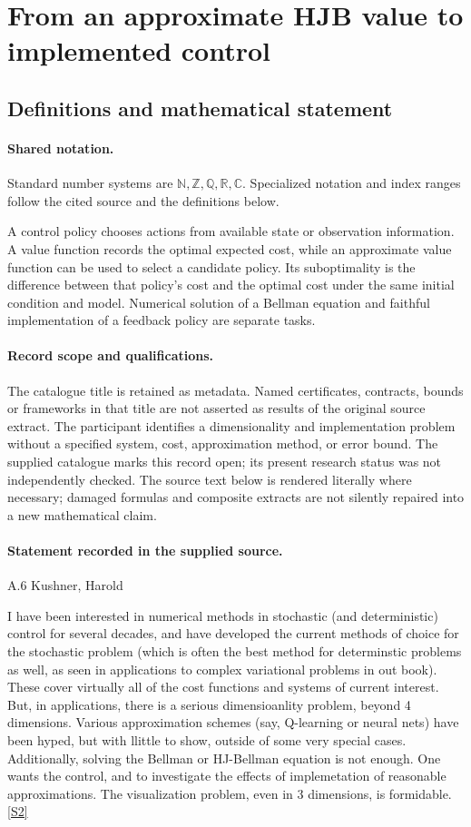 \documentclass[11pt]{article}
\newcommand{\sref}[2]{\hyperlink{source:#1:#2}{[S#2]}}
\begin{document}
\section{From an approximate HJB value to implemented control}\label{statement}

\subsection{Definitions and mathematical statement}

\paragraph{Shared notation.}Standard number systems are $\mathbb N,\mathbb Z,\mathbb Q,\mathbb R,\mathbb C$. Specialized notation and index ranges follow the cited source and the definitions below.


A control policy chooses actions from available state or observation information. A value function records the optimal expected cost, while an approximate value function can be used to select a candidate policy. Its suboptimality is the difference between that policy's cost and the optimal cost under the same initial condition and model. Numerical solution of a Bellman equation and faithful implementation of a feedback policy are separate tasks.
\paragraph{Record scope and qualifications.}
The catalogue title is retained as metadata. Named certificates, contracts, bounds or frameworks in that title are not asserted as results of the original source extract.
The participant identifies a dimensionality and implementation problem without a specified system, cost, approximation method, or error bound. The supplied catalogue marks this record open; its present research status was not independently checked.
The source text below is rendered literally where necessary; damaged formulas and composite extracts are not silently repaired into a new mathematical claim.
\paragraph{Statement recorded in the supplied source.}
A.6 Kushner, Harold

I have been interested in numerical methods in stochastic (and deterministic) control for several decades, and have developed the current methods of choice for the stochastic problem (which is often the best method for determinstic problems as well, as seen in applications to complex variational problems in out book). These cover virtually all of the cost functions and systems of current interest. But, in applications, there is a serious dimensioanlity problem, beyond 4 dimensions. Various approximation schemes (say, Q-learning or neural nets) have been hyped, but with llittle to show, outside of some very special cases. Additionally, solving the Bellman or HJ-Bellman equation is not enough. One wants the control, and to investigate the effects of implemetation of reasonable approximations. The visualization problem, even in 3 dimensions, is formidable. \sref{statement}{2}
\end{document}
